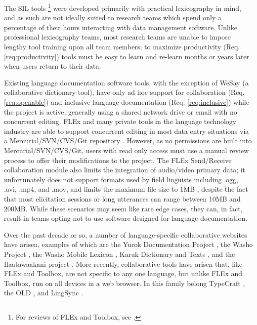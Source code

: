 \documentclass[11pt]{article}
\begin{document}
The SIL tools%
\footnote{For reviews of FLEx and Toolbox, see \cite{Butler:2007,rogers10,robinson07}.} %
were developed primarily with practical lexicography in mind, and as such are
not ideally suited to research teams 
which spend only a percentage of their hours
interacting with data management software. Unlike professional lexicography
teams, most research teams are unable to impose lengthy tool training upon all team
members; to maximize productivity (Req. \autoref{req:productivity}) tools must be easy to learn and re-learn months or years later when users return to their data.

Existing language documentation software tools, with the exception of WeSay (a
collaborative dictionary tool), have only ad hoc support for collaboration (Req. \autoref{req:openable}) and
inclusive language documentation (Req. \autoref{req:inclusive}) while the project is active, generally using a shared network drive or email with no concurrent
editing. 
FLEx  and many private tools in the language technology industry are able to  support concurrent editing in
most data entry situations via a Mercurial/SVN/CVS/Git repository
\cite{FLExSendReceive:2013:Online}. 
However, as no permissions
are built into Mercurial/SVN/CVS/Git, users with read only access  must use a manual review
process to offer their modifications to the project. 
The
FLEx Send/Receive  collaboration module also limits the integration of
audio/video primary data; it unfortunately does not support formats used by
field linguists including .ogg, .avi, .mp4, and .mov, and limits the maximum
file size to 1MB  \cite{FLExSendReceive:2013:Online}, despite the fact that
most elicitation sessions or long utterances can range between 10MB and 200MB. 
While these scenarios may seem like rare edge cases, they can, in fact, result
in teams opting not to use software designed for language documentation.

Over the past decade or so, a number of language-specific collaborative
websites have arisen, examples of which are the Yurok Documentation Project
\cite{Yurok:2001:Online}, the Washo Project
\cite{Washo:2005:Online,Cihlar:2008}, the Washo Mobile Lexicon
\cite{WashoMobile:2008:Online}, Karuk Dictionary and Texts
\cite{Karuk:2009:Online}, and the Ilaatawaakani project \cite{Troy:2014}. More
recently, collaborative  tools have arisen that, like FLEx and Toolbox, are not
specific to any one language, but unlike FLEx and Toolbox, run on all devices
in a web browser.  In this family belong TypeCraft \cite{Beermann:2012}, the
OLD \cite{dunham2014docs}, and LingSync \cite{lingsync:2012}.
\end{document}
